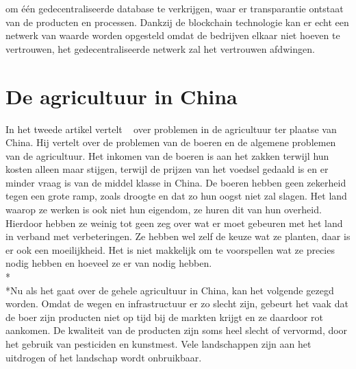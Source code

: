 om één gedecentraliseerde database te verkrijgen, waar er transparantie ontstaat van de producten en processen. Dankzij de blockchain technologie kan er echt een netwerk van waarde worden opgesteld omdat de bedrijven elkaar niet hoeven te vertrouwen, het gedecentraliseerde netwerk zal het vertrouwen afdwingen.

\section{De agricultuur in China}
In het tweede artikel vertelt ~\textcite{agri1} over problemen in de agricultuur ter plaatse van China. Hij vertelt over de problemen van de boeren en de algemene problemen van de agricultuur. Het inkomen van de boeren is aan het zakken terwijl hun kosten alleen maar stijgen, terwijl de prijzen van het voedsel gedaald is en er minder vraag is van de middel klasse in China. De boeren hebben geen zekerheid tegen een grote ramp, zoals droogte en dat zo hun oogst niet zal slagen. Het land waarop ze werken is ook niet hun eigendom, ze huren dit van hun overheid. Hierdoor hebben ze weinig tot geen zeg over wat er moet gebeuren met het land in verband met verbeteringen. Ze hebben wel zelf de keuze wat ze planten, daar is er ook een moeilijkheid. Het is niet makkelijk om te voorspellen wat ze precies nodig hebben en hoeveel ze er van nodig hebben.\\*\\*Nu als het gaat over de gehele agricultuur in China, kan het volgende gezegd worden. Omdat de wegen en infrastructuur er zo slecht zijn, gebeurt het vaak dat de boer zijn producten niet op tijd bij de markten krijgt en ze daardoor rot aankomen. De kwaliteit van de producten zijn soms heel slecht of vervormd, door het gebruik van pesticiden en kunstmest. Vele landschappen zijn aan het uitdrogen of het landschap wordt onbruikbaar.

